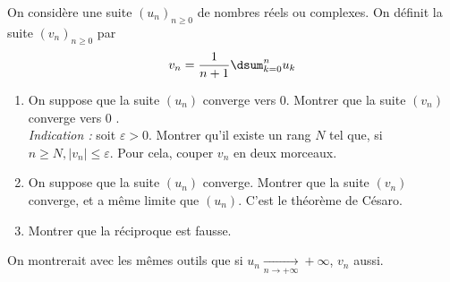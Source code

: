 On considère une suite $\left(u_n\right)_{n \geqslant 0}$ de nombres réels ou complexes. On définit la suite $\left(v_n\right)_{n \geqslant 0}$ par
$$
v_n=\dfrac{1}{n+1}\dsum_{k=0}^n u_k
$$
\begin{enumerate}
\item On suppose que la suite $\left(u_n\right)$ converge vers 0. Montrer que la suite $\left(v_n\right)$ converge vers 0 .\\
\emph{Indication :} soit $\varepsilon>0$. Montrer qu'il existe un rang $N$ tel que, si $n \geqslant N,\left|v_n\right| \leqslant \varepsilon$. Pour cela, couper $v_n$ en deux morceaux.
\item On suppose que la suite $\left(u_n\right)$ converge. Montrer que la suite $\left(v_n\right)$ converge, et a même limite que $(u_n)$. C'est le théorème de Césaro.
\item Montrer que la réciproque est fausse.
\end{enumerate}

On montrerait avec les mêmes outils que si $u_n\xrightarrow[n\to +\infty]{}+\infty$, $v_n$ aussi.
